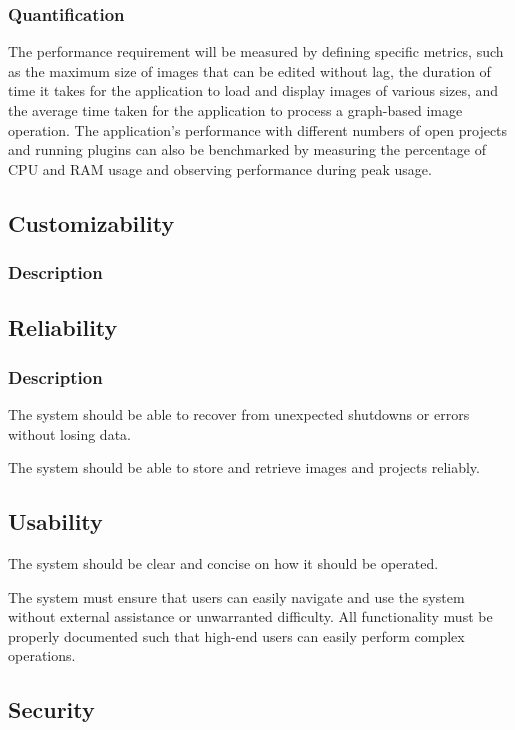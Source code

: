 \documentclass[11pt,a4paper]{article}
\begin{document}
\subsubsection*{Quantification}
The performance requirement will be measured by defining specific metrics, such
as the maximum size of images that can be edited without lag, the duration of
time it takes for the application to load and display images of various sizes,
and the average time taken for the application to process a graph-based image
operation. The application's performance with different numbers of open projects
and running plugins can also be benchmarked by measuring the percentage of CPU
and RAM usage and observing performance during peak usage.


\subsection{Customizability}
\subsubsection*{Description}


\subsection{Reliability} 
\subsubsection*{Description}

The system should be able to recover from unexpected shutdowns or errors without
losing data.

The system should be able to store and retrieve images and projects reliably.


\subsection{Usability} 
The system should be clear and concise on how it should be operated. 

The system must ensure that users can easily navigate and use the system without
external assistance or unwarranted difficulty. All functionality must be
properly documented such that high-end users can easily perform complex
operations.

\subsection{Security} 
\end{document}

